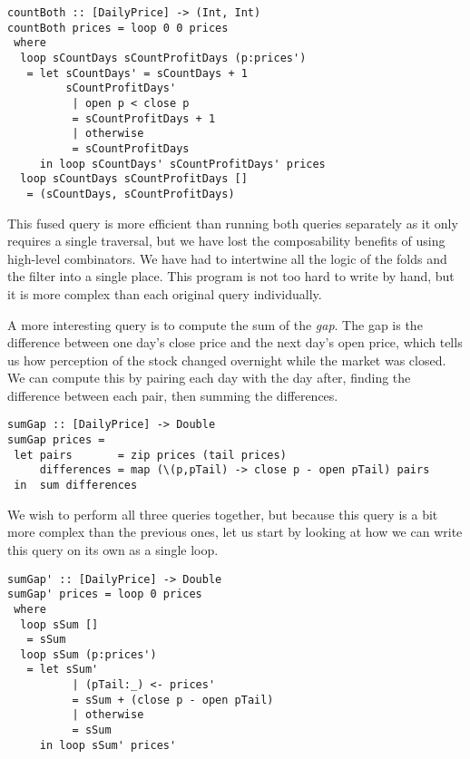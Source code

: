 \begin{lstlisting}
countBoth :: [DailyPrice] -> (Int, Int)
countBoth prices = loop 0 0 prices
 where
  loop sCountDays sCountProfitDays (p:prices')
   = let sCountDays' = sCountDays + 1
         sCountProfitDays'
          | open p < close p
          = sCountProfitDays + 1
          | otherwise
          = sCountProfitDays
     in loop sCountDays' sCountProfitDays' prices
  loop sCountDays sCountProfitDays []
   = (sCountDays, sCountProfitDays)
\end{lstlisting}

This fused query is more efficient than running both queries separately as it only requires a single traversal, but we have lost the composability benefits of using high-level combinators.
We have had to intertwine all the logic of the folds and the filter into a single place.
This program is not too hard to write by hand, but it is more complex than each original query individually.

A more interesting query is to compute the sum of the \emph{gap}.
The gap is the difference between one day's close price and the next day's open price, which tells us how perception of the stock changed overnight while the market was closed.
We can compute this by pairing each day with the day after, finding the difference between each pair, then summing the differences.

\begin{lstlisting}
sumGap :: [DailyPrice] -> Double
sumGap prices =
 let pairs       = zip prices (tail prices)
     differences = map (\(p,pTail) -> close p - open pTail) pairs
 in  sum differences
\end{lstlisting}

We wish to perform all three queries together, but because this query is a bit more complex than the previous ones, let us start by looking at how we can write this query on its own as a single loop.

\begin{lstlisting}
sumGap' :: [DailyPrice] -> Double
sumGap' prices = loop 0 prices
 where
  loop sSum []
   = sSum
  loop sSum (p:prices')
   = let sSum'
          | (pTail:_) <- prices'
          = sSum + (close p - open pTail)
          | otherwise
          = sSum
     in loop sSum' prices'
\end{lstlisting}



